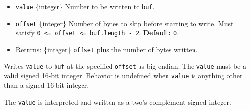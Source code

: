 \begin{itemize}
\tightlist
\item
  \texttt{value} \{integer\} Number to be written to \texttt{buf}.
\item
  \texttt{offset} \{integer\} Number of bytes to skip before starting to
  write. Must satisfy
  \texttt{0\ \textless{}=\ offset\ \textless{}=\ buf.length\ -\ 2}.
  \textbf{Default:} \texttt{0}.
\item
  Returns: \{integer\} \texttt{offset} plus the number of bytes written.
\end{itemize}

Writes \texttt{value} to \texttt{buf} at the specified \texttt{offset}
as big-endian. The \texttt{value} must be a valid signed 16-bit integer.
Behavior is undefined when \texttt{value} is anything other than a
signed 16-bit integer.

The \texttt{value} is interpreted and written as a two's complement
signed integer.

\begin{Shaded}
\begin{Highlighting}[]
\NormalTok{ \{ }\NormalTok{ \} } \OperatorTok{;}

\OperatorTok{=} \NormalTok{(}\NormalTok{)}\OperatorTok{;}

\NormalTok{(}\OperatorTok{,} \NormalTok{)}\OperatorTok{;}

\OperatorTok{;}
\end{Highlighting}
\end{Shaded}

\begin{Shaded}
\begin{Highlighting}[]
\NormalTok{ \{ }\NormalTok{ \} }\OperatorTok{=} \NormalTok{(}\NormalTok{)}\OperatorTok{;}

\OperatorTok{=} \NormalTok{(}\NormalTok{)}\OperatorTok{;}

\NormalTok{(}\OperatorTok{,} \NormalTok{)}\OperatorTok{;}

\OperatorTok{;}
\end{Highlighting}
\end{Shaded}


